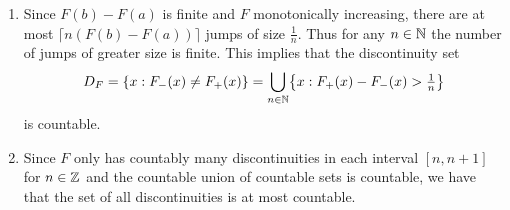 \begin{solution}
\begin{enumerate}[wide=0pt]
    \item[\ref{it: (monotone functions) countable jumps, compact interval}]
    Since \(F(b) - F(a)\) is finite and \(F\) monotonically increasing,
    there are at most \(\lceil n(F(b)-F(a))\rceil\) jumps of size
    \(\frac1n\). Thus for any \(n\in \nat\) the number of jumps of greater
    size is finite. This implies that the discontinuity set
    \[
        D_F = \set{x: F_-(x) \neq F_+(x)} = \bigcup_{n\in \nat} \set[\big]{x: F_+(x) - F_-(x) > \tfrac1n}
    \]
    is countable.

    \item[\ref{it: (monotone functions) countable jumps, real line}]
    Since \(F\) only has countably many discontinuities in each
    interval \([n, n+1]\) for \(n\in \integer\) and the countable union
    of countable sets is countable, we have that the set of all
    discontinuities is at most countable.
\end{enumerate}
\end{solution}
